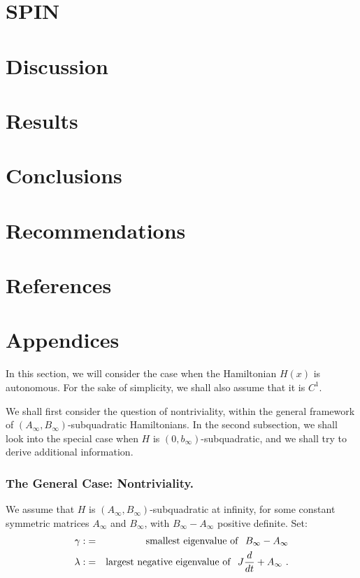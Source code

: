 \documentclass{llncs}
\begin{document}
\section{SPIN}



\section{Discussion}
\section{Results}
\section{Conclusions}
\section{Recommendations}
\section{References}
\section{Appendices}

%
%
In this section, we will consider the case when the Hamiltonian $H(x)$
is autonomous. For the sake of simplicity, we shall also assume that it
is $C^{1}$.

We shall first consider the question of nontriviality, within the
general framework of
$\left(A_{\infty},B_{\infty}\right)$-subquadratic Hamiltonians. In
the second subsection, we shall look into the special case when $H$ is
$\left(0,b_{\infty}\right)$-subquadratic,
and we shall try to derive additional information.
%
\subsubsection{The General Case: Nontriviality.}
%
We assume that $H$ is
$\left(A_{\infty},B_{\infty}\right)$-sub\-qua\-dra\-tic at infinity,
for some constant symmetric matrices $A_{\infty}$ and $B_{\infty}$,
with $B_{\infty}-A_{\infty}$ positive definite. Set:
\begin{eqnarray}
\gamma :&=&{\rm smallest\ eigenvalue\ of}\ \ B_{\infty} - A_{\infty} \\
  \lambda : &=& {\rm largest\ negative\ eigenvalue\ of}\ \
  J \frac{d}{dt} +A_{\infty}\ .
\end{eqnarray}
\end{document}
